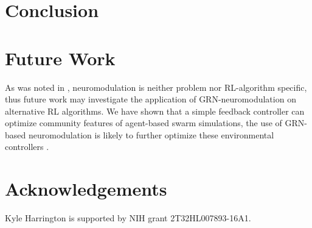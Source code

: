 \section{Conclusion}

\section{Future Work}

As was noted in \cite{Schweighofer2003}, neuromodulation is neither problem nor RL-algorithm specific, thus future work may investigate the application of GRN-neuromodulation on alternative RL algorithms. We have shown that a simple feedback controller can optimize community features of agent-based swarm simulations, the use of GRN-based neuromodulation is likely to further optimize these environmental controllers \cite{Gold2014}.

\section{Acknowledgements}

Kyle Harrington is supported by NIH grant 2T32HL007893-16A1.
